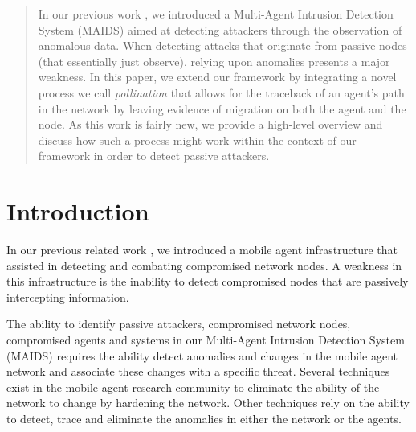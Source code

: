 \documentclass{acm_proc_article-sp}
\begin{document}
\maketitle
\begin{abstract}
In our previous work \cite{kackley09}, we introduced a Multi-Agent Intrusion Detection System (MAIDS) aimed at detecting attackers through the observation of anomalous data.  When detecting attacks that originate from passive nodes (that essentially just observe), relying upon anomalies presents a major weakness.  In this paper, we extend our framework by integrating a novel process we call {\it pollination} that allows for the traceback of an agent's path in the network by leaving evidence of migration on both the agent and the node.  As this work is fairly new, we provide a high-level overview and discuss how such a process might work within the context of our framework in order to detect passive attackers.
\end{abstract}




\section{Introduction}

In our previous related work \cite{kackley09}, we introduced a mobile agent infrastructure that assisted in detecting and combating compromised network nodes.  A weakness in this infrastructure is the inability to detect compromised nodes that are passively intercepting information.

The ability to identify passive attackers, compromised network nodes, compromised agents and systems in our Multi-Agent Intrusion Detection System (MAIDS) requires the ability detect anomalies and changes in the mobile agent network and associate these changes with a specific threat.  Several techniques exist in the mobile agent research community to eliminate the ability of the network to change by hardening the network.  Other techniques rely on the ability to detect, trace and eliminate the anomalies in either the network or the agents.
\end{document}
